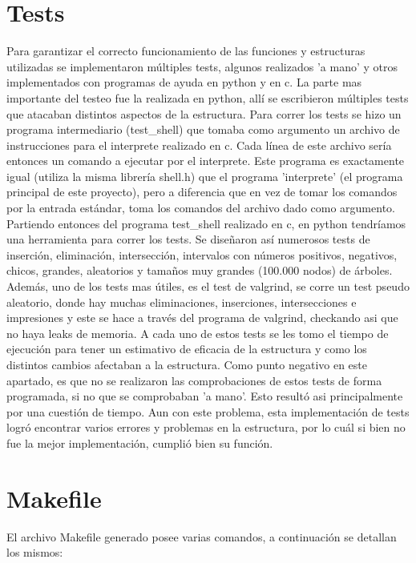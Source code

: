 \documentclass[a4paper, 12pt]{article}
\begin{document}
\section{Tests}
	Para garantizar el correcto funcionamiento de las funciones y estructuras utilizadas se implementaron múltiples tests, algunos realizados 'a mano' y otros implementados con programas de ayuda en python y en c. La parte mas importante del testeo fue la realizada en python, allí se escribieron múltiples tests que atacaban distintos aspectos de la estructura. Para correr los tests se hizo un programa intermediario (test\_shell) que tomaba como argumento un archivo de instrucciones para el interprete realizado en c. Cada línea de este archivo sería entonces un comando a ejecutar por el interprete. Este programa es exactamente igual (utiliza la misma librería shell.h) que el programa 'interprete' (el programa principal de este proyecto), pero a diferencia que en vez de tomar los comandos por la entrada estándar, toma los comandos del archivo dado como argumento.
    Partiendo entonces del programa test\_shell realizado en c, en python tendríamos una herramienta para correr los tests. Se diseñaron así numerosos tests de inserción, eliminación, intersección, intervalos con números positivos, negativos, chicos, grandes, aleatorios y tamaños muy grandes (100.000 nodos) de árboles. Además, uno de los tests mas útiles, es el test de valgrind, se corre un test pseudo aleatorio, donde hay muchas eliminaciones, inserciones, intersecciones e impresiones y este se hace a través del programa de valgrind, checkando asi que no haya leaks de memoria. A cada uno de estos tests se les tomo el tiempo de ejecución para tener un estimativo de eficacia de la estructura y como los distintos cambios afectaban a la estructura. Como punto negativo en este apartado, es que no se realizaron las comprobaciones de estos tests de forma programada, si no que se comprobaban 'a mano'. Esto resultó asi principalmente por una cuestión de tiempo.
    Aun con este problema, esta implementación de tests logró encontrar varios errores y problemas en la estructura, por lo cuál si bien no fue la mejor implementación, cumplió bien su función.
    
\section{Makefile}
	El archivo Makefile generado posee varias comandos, a continuación se detallan los mismos:
    
\end{document}
